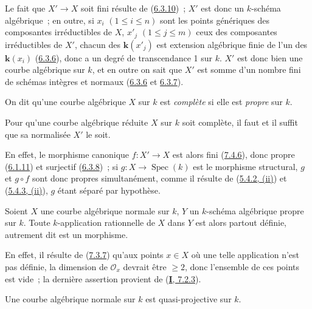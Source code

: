 Le fait que $X'\to X$ soit fini résulte de
(\hyperref[II.6.3.10-fr]{6.3.10})~; $X'$ est donc un $k$-schéma algébrique~;
en outre, si $x_i$ $(1\leq i\leq n)$ sont les points génériques des composantes
irréductibles de $X$, $x'_j$ $(1\leq j\leq m)$ ceux des composantes
irréductibles de $X'$, chacun des $\boldsymbol{k}(x'_j)$ est extension algébrique finie de
l'un des $\boldsymbol{k}(x_i)$ (\hyperref[II.6.3.6-fr]{6.3.6}), donc a un degré de
transcendance 1 sur $k$. $X'$ est donc bien une courbe algébrique sur $k$, et
en outre on sait que $X'$ est somme d'un nombre fini de schémas intègres et
normaux (\hyperref[II.6.3.6-fr]{6.3.6} et
\hyperref[II.6.3.7-fr]{6.3.7}).

\begin{env}[7.4.7]
\label{II.7.4.7-fr}
On dit qu'une courbe algébrique $X$ sur $k$ est \emph{complète} si elle est
\emph{propre} sur $k$.
\end{env}

\begin{corollary}[7.4.8]
\label{II.7.4.8-fr}
Pour qu'une courbe algébrique réduite $X$ sur $k$ soit complète, il faut et il
suffit que sa normalisée $X'$ le soit.
\end{corollary}

En effet, le morphisme canonique $f:X'\to X$ est alors fini
(\hyperref[II.7.4.6-fr]{7.4.6}), donc propre
(\hyperref[II.6.1.11-fr]{6.1.11}) et surjectif
(\hyperref[II.6.3.8-fr]{6.3.8})~; si $g:X\to\operatorname{Spec}(k)$ est le
morphisme structural, $g$ et $g\circ f$ sont donc propres simultanément,
comme il résulte de (\hyperref[II.5.4.2-fr]{5.4.2, (ii)}) et
(\hyperref[II.5.4.3-fr]{5.4.3, (ii)}), $g$ étant séparé par hypothèse.

\begin{proposition}[7.4.9]
\label{II.7.4.9-fr}
Soient $X$ une courbe algébrique \textup{normale} sur $k$, $Y$ un $k$-schéma algébrique
\textup{propre} sur $k$. Toute $k$-application rationnelle de $X$ dans $Y$ est alors
partout définie, autrement dit est un morphisme.
\end{proposition}

En effet, il résulte de (\hyperref[II.7.3.7-fr]{7.3.7}) qu'aux points $x\in X$
où une telle application n'est pas définie, la dimension de $\mathcal{O}_x$
devrait être $\geq2$, donc l'ensemble de ces points est vide~; la dernière
assertion provient de (\hyperref[I.7.2.3-fr]{\textbf{I}, 7.2.3}).

\begin{corollary}[7.4.10]
\label{II.7.4.10-fr}
Une courbe algébrique normale sur $k$ est quasi-projective sur $k$.
\end{corollary}

